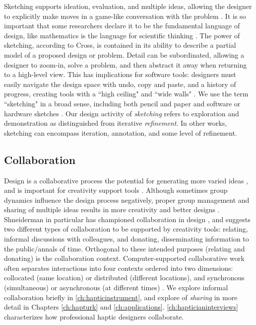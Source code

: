 Sketching supports ideation, evaluation, and multiple ideas,
allowing the designer to
explicitly make moves in a game-like conversation with the problem \cite{Schon1982}.
It is so important that some researchers declare it to be the fundamental language of design, like mathematics is the language for scientific thinking \cite{Cross2006}.
The power of sketching, according to Cross, is contained in its ability to describe a partial model of a proposed design or problem.
Detail can be subordinated, allowing a designer to zoom-in, solve a problem, and then
abstract it away when returning to a high-level view.
This has implications for software tools: designers must easily navigate the design space with undo, copy and paste, and a history of progress, creating tools with a ``high ceiling" and ``wide walls" \cite{Resnick2008}.
We use the term ``sketching" in a broad sense, including both pencil and paper and software or hardware sketches \cite{Moussette2010,Buxton2007}.
Our design activity of \emph{sketching} refers to exploration and demonstration as distinguished from iterative \emph{refinement}.
In other works, sketching can encompass iteration, annotation, and some level of refinement.

\subsection{Collaboration}
Design is a collaborative process
 the potential for generating more varied ideas \cite{Warr2005} , and is important for creativity support tools \cite{Resnick2008,Shneiderman2000}.
Although sometimes group dynamics influence the design process negatively, proper group management and sharing of multiple ideas results in more creativity and better designs \cite{Herring2009}.
Shneiderman in particular has championed collaboration in design \cite{Shneiderman2000}, and suggests two different types of collaboration to be supported by creativity tools: relating, informal discussions with colleagues, and donating, disseminating information to the public/annals of time.
Orthogonal to these intended purposes (relating and donating) is the collaboration context.
Computer-supported collaborative work often separates interactions into four contexts ordered into two dimensions: collocated (same location) or distributed (different locations), and synchronous (simultaneous)  or asynchronous (at different times) \cite{Ellis1991}.
We explore informal collaboration briefly in \autoref{ch:hapticinstrument}, and explore  of \emph{sharing} in more detail in Chapters \ref{ch:hapturk} and \ref{ch:applications}.
\autoref{ch:hapticianinterviews} characterizes how professional haptic designers collaborate.

